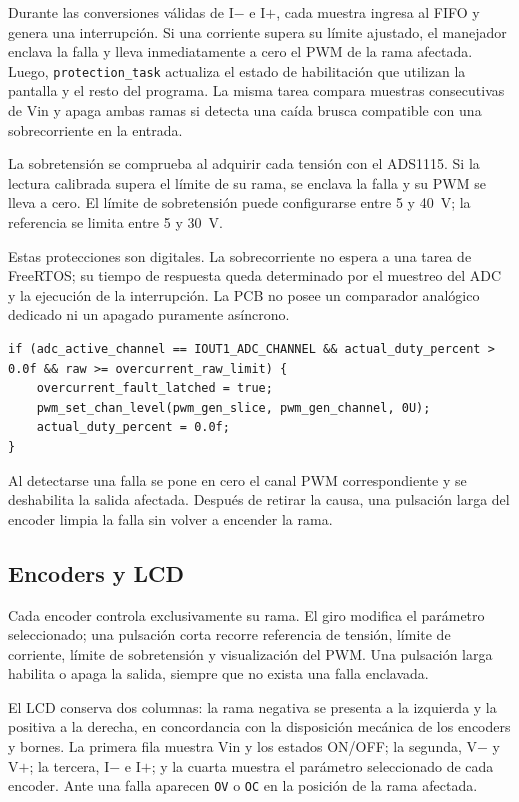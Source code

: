 \documentclass[conference]{IEEEtran}
\begin{document}
Durante las conversiones válidas de I$-$ e I$+$, cada muestra ingresa al FIFO y genera una interrupción. Si una corriente supera su límite ajustado, el manejador enclava la falla y lleva inmediatamente a cero el PWM de la rama afectada. Luego, \texttt{protection\_task} actualiza el estado de habilitación que utilizan la pantalla y el resto del programa. La misma tarea compara muestras consecutivas de Vin y apaga ambas ramas si detecta una caída brusca compatible con una sobrecorriente en la entrada.

La sobretensión se comprueba al adquirir cada tensión con el ADS1115. Si la lectura calibrada supera el límite de su rama, se enclava la falla y su PWM se lleva a cero. El límite de sobretensión puede configurarse entre 5 y 40~V; la referencia se limita entre 5 y 30~V.

Estas protecciones son digitales. La sobrecorriente no espera a una tarea de FreeRTOS; su tiempo de respuesta queda determinado por el muestreo del ADC y la ejecución de la interrupción. La PCB no posee un comparador analógico dedicado ni un apagado puramente asíncrono.

\begin{lstlisting}[caption={Corte inmediato desde la interrupción del ADC.}]
if (adc_active_channel == IOUT1_ADC_CHANNEL && actual_duty_percent > 0.0f && raw >= overcurrent_raw_limit) {
    overcurrent_fault_latched = true;
    pwm_set_chan_level(pwm_gen_slice, pwm_gen_channel, 0U);
    actual_duty_percent = 0.0f;
}
\end{lstlisting}

Al detectarse una falla se pone en cero el canal PWM correspondiente y se deshabilita la salida afectada. Después de retirar la causa, una pulsación larga del encoder limpia la falla sin volver a encender la rama.

\subsection{Encoders y LCD}

Cada encoder controla exclusivamente su rama. El giro modifica el parámetro seleccionado; una pulsación corta recorre referencia de tensión, límite de corriente, límite de sobretensión y visualización del PWM. Una pulsación larga habilita o apaga la salida, siempre que no exista una falla enclavada.

El LCD conserva dos columnas: la rama negativa se presenta a la izquierda y la positiva a la derecha, en concordancia con la disposición mecánica de los encoders y bornes. La primera fila muestra Vin y los estados ON/OFF; la segunda, V$-$ y V$+$; la tercera, I$-$ e I$+$; y la cuarta muestra el parámetro seleccionado de cada encoder. Ante una falla aparecen \texttt{OV} o \texttt{OC} en la posición de la rama afectada.
\end{document}
